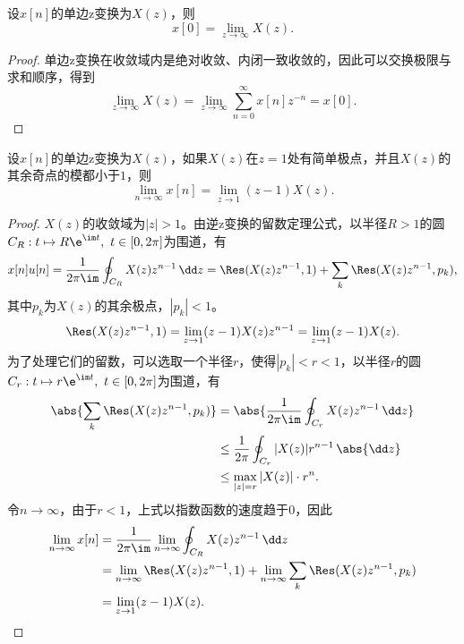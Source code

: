 \begin{theorem}[单边z变换的初值定理]
    设$x[n]$的单边z变换为$X(z)$，则
    \begin{equation}
        x[0]=\lim_{z\to\infty}X(z).
    \end{equation}
\end{theorem}
\begin{proof}
    单边z变换在收敛域内是绝对收敛、内闭一致收敛的，因此可以交换极限与求和顺序，得到
    \begin{equation}
        \lim_{z\to\infty}X(z)=\lim_{z\to\infty}\sum_{n=0}^{\infty}x[n]z^{-n}=x[0].
    \end{equation}
\end{proof}

\begin{theorem}[单边z变换的终值定理]
    设$x[n]$的单边z变换为$X(z)$，如果$X(z)$在$z=1$处有简单极点，并且$X(z)$的其余奇点的模都小于$1$，则
    \begin{equation}
        \lim_{n\to\infty}x[n]=\lim_{z\to 1}(z-1)X(z).
    \end{equation}
\end{theorem}
\begin{proof}
    $X(z)$的收敛域为$|z|>1$。由逆z变换的留数定理公式，以半径$R>1$的圆$C_R:t\mapsto R\e^{\im t},\ t\in[0,2\pi]$为围道，有
    \begin{equation}
        x[n]u[n]=\frac{1}{2\pi\im}\oint_{C_R}X(z)z^{n-1}\,\dd z=\Res(X(z)z^{n-1},1)+\sum_{k}\Res(X(z)z^{n-1},p_k),
    \end{equation}
    其中$p_k$为$X(z)$的其余极点，$|p_k|<1$。
    \begin{equation}
        \Res(X(z)z^{n-1},1)=\lim_{z\to 1}(z-1)X(z)z^{n-1}=\lim_{z\to 1}(z-1)X(z).
    \end{equation}
    为了处理它们的留数，可以选取一个半径$r$，使得$|p_k|<r<1$，以半径$r$的圆$C_{r}:t\mapsto r\e^{\im t},\ t\in[0,2\pi]$为围道，有
    \begin{align}
        \abs{\sum_{k}\Res(X(z)z^{n-1},p_k)}&=\abs{\frac{1}{2\pi\im}\oint_{C_r}X(z)z^{n-1}\,\dd z} \nonumber \\
        &\leq \frac{1}{2\pi}\oint_{C_r}|X(z)|r^{n-1}\,\abs{\dd z} \nonumber \\
        &\leq \max_{|z|=r}|X(z)|\cdot r^{n}.
    \end{align}
    令$n\to\infty$，由于$r<1$，上式以指数函数的速度趋于$0$，因此
    \begin{align}
        \lim_{n\to\infty}x[n]&=\frac{1}{2\pi\im}\lim_{n\to\infty}\oint_{C_R}X(z)z^{n-1}\,\dd z \nonumber \\
        &=\lim_{n\to\infty}\Res(X(z)z^{n-1},1)+\lim_{n\to\infty}\sum_{k}\Res(X(z)z^{n-1},p_k) \nonumber \\
        &=\lim_{z\to 1}(z-1)X(z).
    \end{align}
\end{proof}


